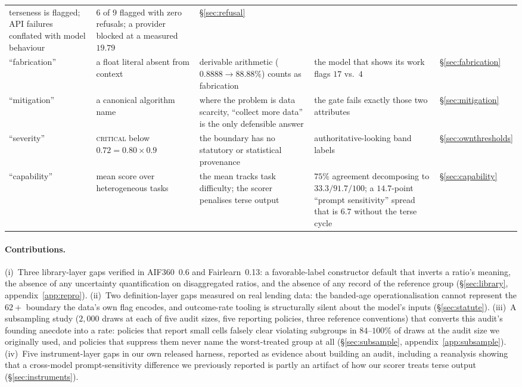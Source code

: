 \documentclass[sigconf,nonacm]{acmart}
\begin{document}
\begin{table}[t]
\begin{tabular}{@{}p{2.5cm}p{3.6cm}p{4.6cm}p{4.2cm}l@{}}
terseness is flagged; API failures conflated with model behaviour & 6 of 9
flagged with zero refusals; a provider blocked at a measured $19.79$
& \S\ref{sec:refusal}\\
\addlinespace[2pt]
``fabrication'' & a float literal absent from context & derivable arithmetic
($0.8888 \to 88.88\%$) counts as fabrication & the model that shows its work
flags $17$ vs.\ $4$ & \S\ref{sec:fabrication}\\
\addlinespace[2pt]
``mitigation'' & a canonical algorithm name & where the problem is data
scarcity, ``collect more data'' is the only defensible answer & the gate fails
exactly those two attributes & \S\ref{sec:mitigation}\\
\addlinespace[2pt]
``severity'' & \textsc{critical} below $0.72 = 0.80 \times 0.9$ & the boundary
has no statutory or statistical provenance & authoritative-looking band labels
& \S\ref{sec:ownthresholds}\\
\addlinespace[2pt]
``capability'' & mean score over heterogeneous tasks & the mean tracks task
difficulty; the scorer penalises terse output & $75\%$ agreement decomposing
to $33.3/91.7/100$; a $14.7$-point ``prompt sensitivity'' spread that is $6.7$
without the terse cycle & \S\ref{sec:capability}\\
\bottomrule
\end{tabular}
\end{table}

\paragraph{Contributions.}
(i)~Three library-layer gaps verified in AIF360~0.6 and
Fairlearn~0.13: a favorable-label constructor
default that inverts a ratio's meaning, the absence of any uncertainty
quantification on disaggregated ratios, and the absence of any record of the
reference group (\S\ref{sec:library}, appendix~\ref{app:repro}).
(ii)~Two definition-layer gaps measured on real lending data: the banded-age
operationalisation cannot represent the $62{+}$ boundary the data's own flag
encodes, and outcome-rate tooling is structurally silent about the model's
inputs (\S\ref{sec:statute}).
(iii)~A subsampling study ($2{,}000$ draws at each of five audit sizes,
five reporting policies, three reference conventions) that converts this
audit's founding anecdote into a rate: policies that report small cells
falsely clear violating subgroups in $84$--$100\%$ of draws at the audit size
we originally used, and policies that suppress them never name the
worst-treated group at all (\S\ref{sec:subsample}, appendix~\ref{app:subsample}).
(iv)~Five instrument-layer gaps in our own released harness, reported as
evidence about building an audit, including a reanalysis showing that a
cross-model prompt-sensitivity difference we previously reported is partly an
artifact of how our scorer treats terse output (\S\ref{sec:instruments}).
\end{document}
